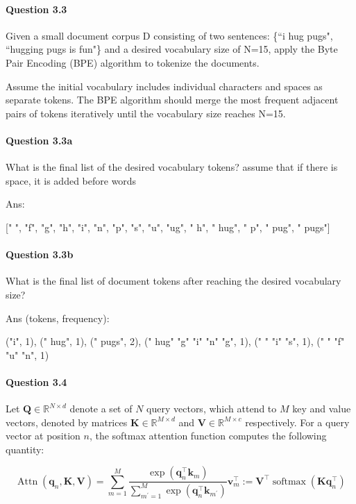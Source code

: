 \documentclass[10pt]{article}
\begin{document}
\newpage
\paragraph{Question 3.3}
Given a small document corpus D consisting of two sentences: \{``i hug pugs", ``hugging pugs is fun"\} and a desired vocabulary size of N=15, apply the Byte Pair Encoding (BPE) algorithm to tokenize the documents.

Assume the initial vocabulary includes individual characters and spaces as separate tokens. The BPE algorithm should merge the most frequent adjacent pairs of tokens iteratively until the vocabulary size reaches N=15.

\paragraph{Question 3.3a} What is the final list of the desired vocabulary tokens?
assume that if there is space, it is added before words

Ans: 

[" ", "f", "g", "h", "i", "n", "p", "s", "u", "ug", " h", " hug", " p", " pug",  " pugs"]

\paragraph{Question 3.3b} What is the final list of document tokens after reaching the desired vocabulary size?

Ans (tokens, frequency):

("i", 1), (" hug", 1), (" pugs", 2), (" hug" "g" "i" "n" "g", 1), (" " "i" "s", 1), (" " "f" "u" "n", 1)


\newpage
\paragraph{Question 3.4} Let $\mathbf{Q} \in \mathbb{R}^{N \times d}$ denote a set of $N$ query vectors, which attend to $M$ key and value vectors, denoted by matrices $\mathbf{K} \in \mathbb{R}^{M \times d}$ and $\mathbf{V} \in \mathbb{R}^{M \times c}$ respectively. For a query vector at position $n$, the softmax attention function computes the following quantity:

$$
  \operatorname{Attn}\left(\mathbf{q}_{n}, \mathbf{K}, \mathbf{V}\right)=\sum_{m=1}^{M} \frac{\exp \left(\mathbf{q}_{n}^{\top} \mathbf{k}_{m}\right)}{\sum_{m^{\prime}=1}^{M} \exp \left(\mathbf{q}_{n}^{\top} \mathbf{k}_{m^{\prime}}\right)} \mathbf{v}_{m}^{\top}:=\mathbf{V}^{\top} \operatorname{softmax}\left(\mathbf{K} \mathbf{q}_{n}^{\top}\right)
$$
\end{document}
